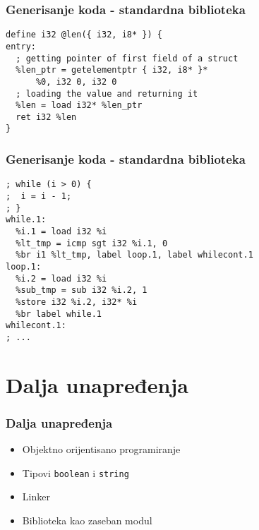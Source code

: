 \documentclass{beamer}
\newcommand{\code}[1]{\texttt{#1}}
\begin{document}

\begin{frame}[fragile]
	\frametitle{Generisanje koda - standardna biblioteka}
	\begin{lstlisting}
define i32 @len({ i32, i8* }) {
entry:
  ; getting pointer of first field of a struct
  %len_ptr = getelementptr { i32, i8* }*
      %0, i32 0, i32 0
  ; loading the value and returning it
  %len = load i32* %len_ptr
  ret i32 %len
}
\end{lstlisting}

\end{frame}

\begin{frame}[fragile]
	\frametitle{Generisanje koda - standardna biblioteka}
	\begin{lstlisting}
; while (i > 0) {
;  i = i - 1;
; }
while.1:
  %i.1 = load i32 %i
  %lt_tmp = icmp sgt i32 %i.1, 0
  %br i1 %lt_tmp, label loop.1, label whilecont.1
loop.1:
  %i.2 = load i32 %i
  %sub_tmp = sub i32 %i.2, 1
  %store i32 %i.2, i32* %i
  %br label while.1
whilecont.1:
; ...
\end{lstlisting}
\end{frame}


\section{Dalja unapređenja}
\begin{frame}
	\frametitle{Dalja unapređenja}
	\begin{itemize}
	\item Objektno orijentisano programiranje
	\item Tipovi \code{boolean} i \code{string}
	\item Linker
	\item Biblioteka kao zaseban modul
	\end{itemize}
\end{frame}
\end{document}
